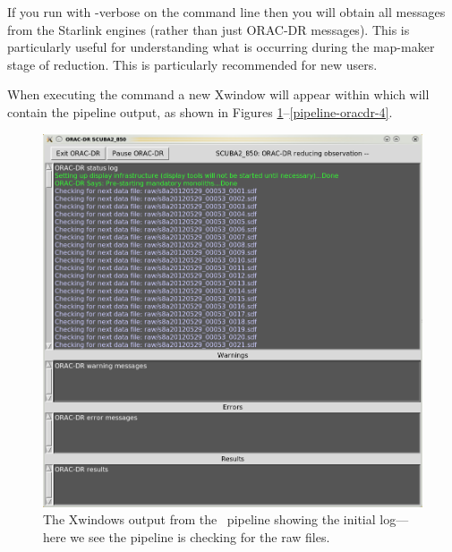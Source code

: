 \begin{tip}
  If you run with -verbose on the command line then you will obtain all messages
 from the Starlink engines (rather than just ORAC-DR messages). This is
 particularly useful for understanding what is occurring during the map-maker stage
 of reduction. This is particularly recommended for new users.
\end{tip}

When executing the \oracdr command a new Xwindow will appear within which
will contain the pipeline output, as shown in Figures
\ref{pipeline-oracdr-1}--\ref{pipeline-oracdr-4}.

\begin{figure}
\begin{center}
\includegraphics[width=0.7\linewidth]{sc21-pipeline-oracdr-1}
\caption[Output from the pipeline]{The Xwindows output from the \oracdr\
pipeline showing the initial log---here we see the pipeline is checking
for the raw files. \label{pipeline-oracdr-1}}
\end{center}
\end{figure}

